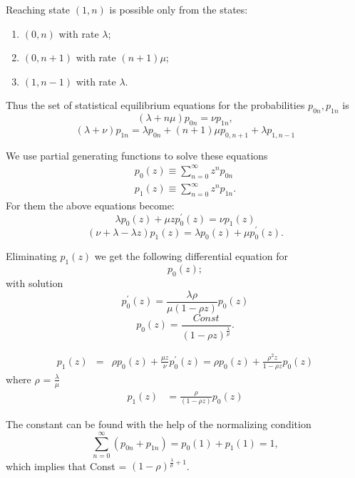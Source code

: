 \documentclass[10pt]{article}
\begin{document}
Reaching state $(1,n)$ is possible only from the states: \\

  \begin{enumerate}
    \item $(0,n)$ with rate $\lambda$; 
    \item $(0,n+1)$ with rate $(n+1)\mu$; 
    \item $(1, n-1)$ with rate $\lambda$.
  \end{enumerate}

  Thus the set of statistical equilibrium equations for the probabilities $p_{0n}, p_{1n}$ is
  \[(\lambda+n\mu)p_{0n}=\nu p_{1n},\]
  \[(\lambda+\nu)p_{1n}=\lambda p_{0n}+(n+1)\mu p_{0,n+1}+\lambda p_{1,n-1} \]

  We use partial generating functions to solve these equations
\begin{align*}
  p_{0}(z)\equiv\sum_{n=0}^{\infty}z^{n}p_{0n}\\
  p_{1}(z)\equiv\sum_{n=0}^{\infty}z^{n}p_{1n}.
\end{align*}
  For them the above equations become:
  \[\lambda p_{0}(z)+\mu zp_{0}^{\prime}(z)=\nu p_{1}(z)\]
  \[(\nu+\lambda-\lambda z)p_{1}(z)=\lambda p_{0}(z)+\mu p_{0}^{\prime}(z).\]

  Eliminating $p_{1}(z)$ we get the following differential equation for 
  \[p_{0}(z);\]
  with solution
  \[p_{0}^{\prime}(z)=\frac{\lambda\rho}{\mu(1-\rho z)}p_{0}(z)\]
  \[p_{0}(z)=\frac{Const}{(1-\rho z)^{\frac{\lambda}{\mu}}}.\]
  
  \[\begin{matrix}p_{1}(z)&=&\rho p_{0}(z)+\frac{\mu z}{\nu}p_{0}^{\prime}(z)=\rho p_{0}(z)+\frac{\rho^{2}z}{1-\rho z}p_{0}(z)\end{matrix}\]
  where $\rho$ = $\frac{\lambda}{\mu}$
  \begin{align*}
    p_{1}(z)&=\frac{\rho}{(1-\rho z)}p_0(z)
  \end{align*}

  The constant can be found with the help of the normalizing condition
  \[\sum_{n=0}^{\infty}(p_{0n}+p_{1n})=p_{0}(1)+p_{1}(1)=1,\]
  which implies that
  Const = $(1-\rho)^{\frac{\lambda}{\mu}+1}$.
\renewcommand{\qed}{\hfill\blacksquare}
\newcommand{\qedwhite}{\hfill \ensuremath{\Box}}
\qed
\end{document}
